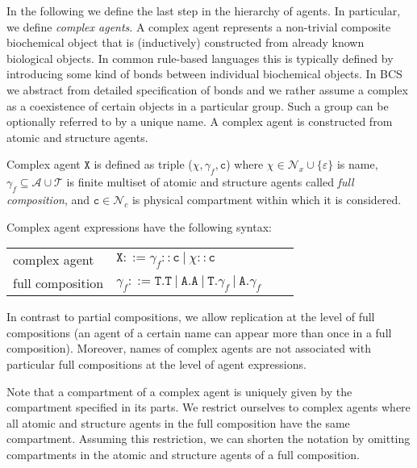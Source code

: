 \documentclass{entcs}
\renewcommand{\~}[0]{\texttildelow}
\begin{document}
In the following we define the last step in the hierarchy of agents. In particular, we define \textit{complex agents}. A complex agent represents a non-trivial composite biochemical object that is (inductively) constructed from already known biological objects. In common rule-based languages this is typically defined by introducing some kind of bonds between individual biochemical objects. In BCS we abstract from detailed specification of bonds and we rather assume a complex as a coexistence of certain objects in a particular group. Such a group can be optionally referred to by a unique name. A complex agent is constructed from atomic and structure agents.

\begin{definition}
Complex agent $\mathtt{X}$ is defined as triple ($\chi, \gamma_f, \mathtt{c}$) where $\chi \in \mathcal{N}_{x} \cup \{\varepsilon\}$ is name, $\gamma_f \subseteq \mathcal{A} \cup \mathcal{T}$ is finite multiset of atomic and structure agents called \emph{full composition}, and $\mathtt{c} \in \mathcal{N}_{c}$ is physical compartment within which it is considered.
\end{definition}

Complex agent expressions have the following syntax:

\begin{center}
{\small
\hspace*{-1 cm}\begin{tabular}{ ll ll }
 complex agent & $\mathtt{X}::=\gamma_f::\mathtt{c}~|~\chi::\mathtt{c}$\\
 full composition & $\gamma_f ::= \mathtt{T}.\mathtt{T}~|~\mathtt{A}.\mathtt{A}~|~\mathtt{T}.\gamma_{f}~|~\mathtt{A}.\gamma_{f}$
\end{tabular}
}
\end{center}

In contrast to partial compositions, we allow replication at the level of full compositions (an agent of a certain name can appear more than once in a full composition). Moreover, names of complex agents are not associated with particular full compositions at the level of agent expressions.

Note that a compartment of a complex agent is uniquely given by the compartment specified in its parts. We restrict ourselves to complex agents where all atomic and structure agents in the full composition have the same compartment. Assuming this restriction, we can shorten the notation by omitting compartments in the atomic and structure agents of a full composition. 
\end{document}
